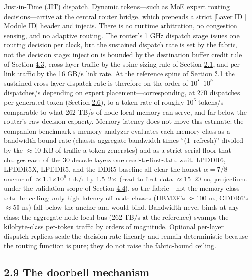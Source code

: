 \documentclass[10pt,twocolumn]{article}
\begin{document}
Just-in-Time (JIT) dispatch. Dynamic tokens---such as MoE expert routing decisions---arrive at the central router bridge, which prepends a strict [Layer ID | Module ID] header and injects. There is no runtime arbitration, no congestion sensing, and no adaptive routing. The router's 1 GHz dispatch stage issues one routing decision per clock, but the sustained dispatch rate is set by the fabric, not the decision stage: injection is bounded by the destination buffer credit rule of Section \hyperref[sec:4.3]{4.3}, cross-layer traffic by the spine sizing rule of Section \hyperref[sec:2.1]{2.1}, and per-link traffic by the 16 GB/s link rate. At the reference spine of Section \hyperref[sec:2.1]{2.1} the sustained cross-layer dispatch rate is therefore on the order of $10^{8}$--$10^{9}$ dispatches/s depending on expert placement---corresponding, at 270 dispatches per generated token (Section \hyperref[sec:2.6]{2.6}), to a token rate of roughly $10^{6}$ tokens/s---comparable to what 262 TB/s of node-local memory can serve, and far below the router's raw decision capacity. Memory latency does not move this estimate: the companion benchmark's memory analyzer evaluates each memory class as a bandwidth-bound rate (chassis aggregate bandwidth times ``(1--refresh)'' divided by the $\approx$10 KB of traffic a token generates) and as a strict serial floor that charges each of the 30 decode layers one read-to-first-data wait. LPDDR6, LPDDR5X, LPDDR5, and the DDR5 baseline all clear the honest $\alpha=7/8$ anchor of $\approx$1.1$\times10^{6}$ tok/s by 1.5--2$\times$ (read-to-first-data $\approx$15--20 ns, projections under the validation scope of Section \hyperref[sec:4.4]{4.4}), so the fabric---not the memory class---sets the ceiling; only high-latency off-node classes (HBM3E's $\approx$100 ns, GDDR6's $\approx$50 ns) fall below the anchor and would bind. Bandwidth never binds at any class: the aggregate node-local bus (262 TB/s at the reference) swamps the kilobyte-class per-token traffic by orders of magnitude. Optional per-layer dispatch replicas scale the decision rate linearly and remain deterministic because the routing function is pure; they do not raise the fabric-bound ceiling.

\subsection*{2.9 The doorbell mechanism}\label{sec:2.9}
\end{document}
